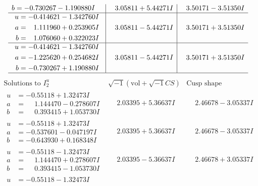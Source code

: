 \documentclass[1p]{elsarticle_modified}
\theoremstyle{definition}
\newcommand{\I}{\sqrt{-1}}
\begin{document}
$$\begin{array}{c|c|c}
\begin{aligned}
b &= -0.730267 - 1.190880 I\end{aligned}
 & \phantom{-}3.05811 + 5.44271 I & \phantom{-}3.50171 - 3.51350 I \\ \hline\begin{aligned}
u &= -0.414621 - 1.342760 I \\
a &= \phantom{-}1.111960 + 0.253905 I \\
b &= \phantom{-}1.076060 + 0.322023 I\end{aligned}
 & \phantom{-}3.05811 - 5.44271 I & \phantom{-}3.50171 + 3.51350 I \\ \hline\begin{aligned}
u &= -0.414621 - 1.342760 I \\
a &= -1.225620 + 0.254682 I \\
b &= -0.730267 + 1.190880 I\end{aligned}
 & \phantom{-}3.05811 - 5.44271 I & \phantom{-}3.50171 + 3.51350 I\\
 \hline 
 \end{array}$$\newpage$$\begin{array}{c|c|c}  
\text{Solutions to }I^u_{2}& \I (\text{vol} + \sqrt{-1}CS) & \text{Cusp shape}\\
 \hline 
\begin{aligned}
u &= -0.55118 + 1.32473 I \\
a &= \phantom{-}1.144470 - 0.278607 I \\
b &= \phantom{-}0.393415 + 1.053730 I\end{aligned}
 & \phantom{-}2.03395 + 5.36637 I & \phantom{-}2.46678 - 3.05337 I \\ \hline\begin{aligned}
u &= -0.55118 + 1.32473 I \\
a &= -0.537601 - 0.047197 I \\
b &= -0.643930 + 0.168348 I\end{aligned}
 & \phantom{-}2.03395 + 5.36637 I & \phantom{-}2.46678 - 3.05337 I \\ \hline\begin{aligned}
u &= -0.55118 - 1.32473 I \\
a &= \phantom{-}1.144470 + 0.278607 I \\
b &= \phantom{-}0.393415 - 1.053730 I\end{aligned}
 & \phantom{-}2.03395 - 5.36637 I & \phantom{-}2.46678 + 3.05337 I \\ \hline\begin{aligned}
u &= -0.55118 - 1.32473 I \\

\end{aligned}
\end{array}$$
\end{document}
